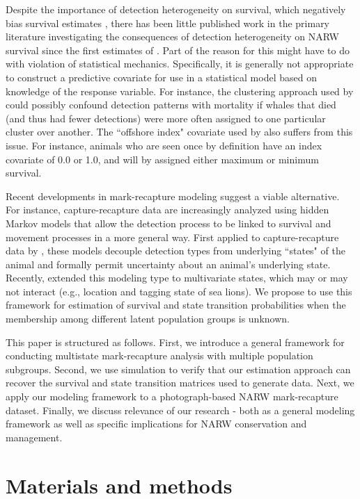 \documentclass[times,mee,doublespace,]{besauth2}
\begin{document}
Despite the importance of detection heterogeneity on survival, which negatively bias survival estimates \citep{AbadiEtAl2013}, there has been little published work in the primary literature investigating the consequences of detection heterogeneity on NARW survival since the first estimates of \citet{CaswellEtAl1999}.  Part of the reason for this might have to do with violation of statistical mechanics.  Specifically, it is generally not appropriate to construct a predictive covariate for use in a statistical model based on knowledge of the response variable.  For instance, the clustering approach used by \citet{WadeClaphamUnpublished} could possibly confound detection patterns with mortality if whales that died (and thus had fewer detections) were more often assigned to one particular cluster over another.  The ``offshore index" covariate used by \citet{CaswellEtAl1999} also suffers from this issue.  For instance, animals who are seen once by definition have an index covariate of 0.0 or 1.0, and will by assigned either maximum or minimum survival.

Recent developments in mark-recapture modeling suggest a viable alternative.  For instance, capture-recapture data are increasingly analyzed using hidden Markov models \citep[HMMs][]{ZucchiniMacDonald2009} that allow the detection process to be linked to survival and movement processes in a more general way.  First applied to capture-recapture data by \citet{Pradel2005}, these models decouple detection types from underlying ``states" of the animal and formally permit uncertainty about an animal's underlying state.  Recently, \citet{JohnsonEtAl2016} extended this modeling type to multivariate states, which may or may not interact (e.g., location and tagging state of sea lions).  We propose to use this framework for estimation of survival and state transition probabilities when the membership among different latent population groups is unknown.

This paper is structured as follows.  First, we introduce a general framework for conducting multistate mark-recapture analysis with multiple population subgroups.  Second, we use simulation to verify that our estimation approach can recover the survival and state transition matrices used to generate data.  Next, we apply our modeling framework to a photograph-based NARW mark-recapture dataset.  Finally, we discuss relevance of our research - both as a general modeling framework as well as specific implications for NARW conservation and management.


\section{Materials and methods}
\end{document}
